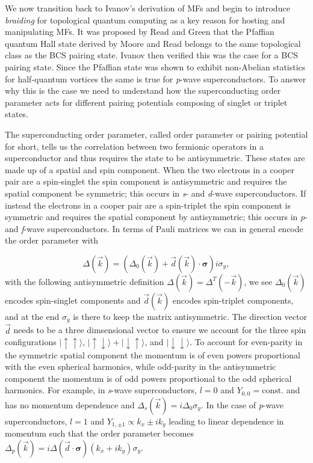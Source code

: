 We now transition back to Ivanov's derivation of MFs and begin to introduce \textit{braiding} for topological quantum computing as a key reason for hosting and manipulating MFs.
It was proposed by Read and Green that the Pfaffian quantum Hall state derived by Moore and Read belongs to the same topological class as the BCS pairing state.
Ivanov then verified this was the case for a BCS pairing state.
Since the Pfaffian state was shown to exhibit non-Abelian statistics for half-quantum vortices the same is true for \textit{p}-wave superconductors.
To answer why this is the case we need to understand how the superconducting order parameter acts for different pairing potentials composing of singlet or triplet states.

The superconducting order parameter, called order parameter or pairing potential for short, tells us the correlation between two fermionic operators in a superconductor and thus requires the state to be antisymmetric.
These states are made up of a spatial and spin component.
When the two electrons in a cooper pair are a spin-singlet the spin component is antisymmetric and requires the spatial component be symmetric; this occurs in \textit{s}- and \textit{d}-wave superconductors.
If instead the electrons in a cooper pair are a spin-triplet the spin component is symmetric and requires the spatial component by antisymmetric; this occurs in \textit{p}- and \textit{f}-wave superconductors.
In terms of Pauli matrices we can in general encode the order parameter with

\begin{equation}
  \Delta (\vec{k}) = \left(\Delta_0 (\vec{k}) + \vec{d}(\vec{k}) \cdot \bm{\sigma}\right) i \sigma_y,
\end{equation}
with the following antisymmetric definition $\Delta(\vec{k}) = \Delta^T(-\vec{k})$, we see $\Delta_0 (\vec{k})$ encodes spin-singlet components and $\vec{d}(\vec{k})$ encodes spin-triplet components, and at the end $\sigma_y$ is there to keep the matrix antisymmetric.
The direction vector $\vec{d}$ needs to be a three dimsensional vector to ensure we account for the three spin configurations
$|\uparrow\uparrow\rangle$, $|\uparrow\downarrow\rangle + |\downarrow\uparrow\rangle$, and $|\downarrow\downarrow\rangle$.
To account for even-parity in the symmetric spatial component the momentum is of even powers proportional with the even spherical harmonics, while odd-parity in the antisymmetric component the momentum is of odd powers proportional to the odd spherical harmonics.
For example, in \textit{s}-wave superconductors, $l=0$ and $Y_{0,0} = \text{const.}$ and has no momentum dependence and
$\Delta_s (\vec{k}) = i\Delta_0 \sigma_y$.
In the case of \textit{p}-wave superconductors, $l=1$ and $Y_{1,\pm1} \propto k_x \pm i k_y$ leading to linear dependence in momentum such that the order parameter becomes
$\Delta_p(\vec{k}) = i\Delta (\vec{d} \cdot \bm{\sigma}) (k_x+ik_y) \sigma_y$.

